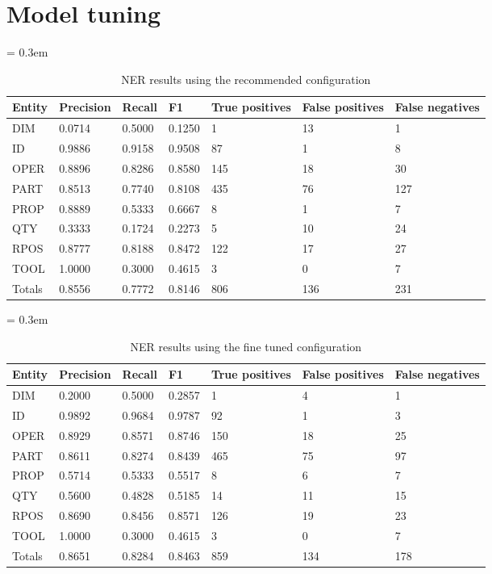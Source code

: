 \section{Model tuning}\label{sec:model-tuning}


\begin{table}[ht]
	\caption{NER results using the recommended configuration}
	\tabulinesep = 0.3em
	\setlength{\tabcolsep}{0.2em}
	\centering
	\begin{tabu} { X[c,m] X[r,m] X[r,m] X[r,m] X[r,m] X[r,m] X[r,m] }
		\rowfont{\bfseries\itshape} Entity & Precision & Recall & F1 & True positives & False positives & False negatives \\
		\hline
		DIM & 0.0714 & 0.5000 & 0.1250 & 1 & 13 & 1 \\
		ID & 0.9886 & 0.9158 & 0.9508 & 87 & 1 & 8 \\
		OPER & 0.8896 & 0.8286 & 0.8580 & 145 & 18 & 30 \\
		PART & 0.8513 & 0.7740 & 0.8108 & 435 & 76 & 127 \\
		PROP & 0.8889 & 0.5333 & 0.6667 & 8 & 1 & 7 \\
		QTY & 0.3333 & 0.1724 & 0.2273 & 5 & 10 & 24 \\
		RPOS & 0.8777 & 0.8188 & 0.8472 & 122 & 17 & 27 \\
		TOOL & 1.0000 & 0.3000 & 0.4615 & 3 & 0 & 7 \\
		\rowfont{\bfseries} Totals & 0.8556 & 0.7772 & 0.8146 & 806 & 136 & 231 \\
	\end{tabu}
	\label{tab:results_recommended-configuration}
\end{table}


\begin{table}[ht]
	\caption{NER results using the fine tuned configuration}
	\tabulinesep = 0.3em
	\setlength{\tabcolsep}{0.2em}
	\centering
	\begin{tabu} { X[c,m] X[r,m] X[r,m] X[r,m] X[r,m] X[r,m] X[r,m] }
		\rowfont{\bfseries\itshape} Entity & Precision & Recall & F1 & True positives & False positives & False negatives \\
		\hline
		DIM & 0.2000 & 0.5000 & 0.2857 & 1 & 4 & 1 \\
		ID & 0.9892 & 0.9684 & 0.9787 & 92 & 1 & 3 \\
		OPER & 0.8929 & 0.8571 & 0.8746 & 150 & 18 & 25 \\
		PART & 0.8611 & 0.8274 & 0.8439 & 465 & 75 & 97 \\
		PROP & 0.5714 & 0.5333 & 0.5517 & 8 & 6 & 7 \\
		QTY & 0.5600 & 0.4828 & 0.5185 & 14 & 11 & 15 \\
		RPOS & 0.8690 & 0.8456 & 0.8571 & 126 & 19 & 23 \\
		TOOL & 1.0000 & 0.3000 & 0.4615 & 3 & 0 & 7 \\
		\rowfont{\bfseries} Totals & 0.8651 & 0.8284 & 0.8463 & 859 & 134 & 178 \\
	\end{tabu}
	\label{tab:results_optimal-configuration}
\end{table}



